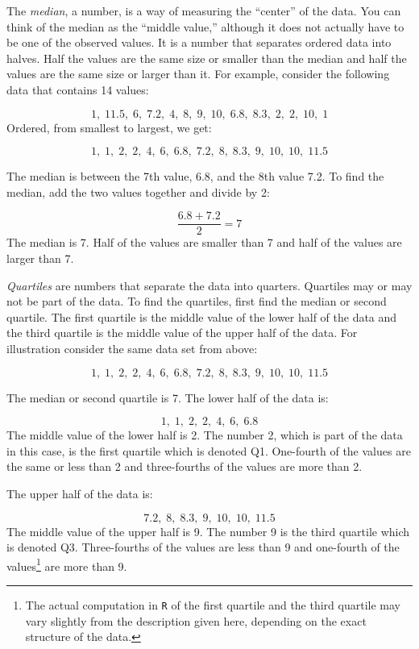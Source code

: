 \documentclass[]{krantz}
\theoremstyle{definition}
\theoremstyle{definition}
\theoremstyle{definition}
\theoremstyle{remark}
\begin{document}
The \emph{median}, a number, is a way of measuring the ``center'' of the data.
You can think of the median as the ``middle value,'' although it does not
actually have to be one of the observed values. It is a number that
separates ordered data into halves. Half the values are the same size or
smaller than the median and half the values are the same size or larger
than it. For example, consider the following data that contains 14
values:

\[1,\;   11.5,\;   6,\;   7.2,\;   4,\;   8,\;   9,\;   10,\;   6.8,\;   8.3,\;   2,\;   2,\;   10,\;   1\]
Ordered, from smallest to largest, we get:

\[1,\;   1,\;   2,\;   2,\;   4,\;   6,\;   6.8,\;   7.2,\;   8,\;   8.3,\;   9,\;   10,\;   10,\;   11.5\]

The median is between the 7th value, 6.8, and the 8th value 7.2. To find
the median, add the two values together and divide by 2:

\[\frac{6.8+7.2}{2} = 7\] The median is 7. Half of the values are
smaller than 7 and half of the values are larger than 7.

\emph{Quartiles} are numbers that separate the data into quarters. Quartiles
may or may not be part of the data. To find the quartiles, first find
the median or second quartile. The first quartile is the middle value of
the lower half of the data and the third quartile is the middle value of
the upper half of the data. For illustration consider the same data set
from above:

\[1,\;   1,\;   2,\;   2,\;   4,\;   6,\;   6.8,\;   7.2,\;   8,\;   8.3,\;   9,\;   10,\;   10,\;   11.5\]

The median or second quartile is 7. The lower half of the data is:

\[1,\;   1,\;   2,\;   2,\;   4,\;   6,\;   6.8\] The middle value of
the lower half is 2. The number 2, which is part of the data in this
case, is the first quartile which is denoted Q1. One-fourth of the
values are the same or less than 2 and three-fourths of the values are
more than 2.

The upper half of the data is:

\[7.2,\;   8,\;   8.3,\;   9,\;   10,\;   10,\;   11.5\] The middle
value of the upper half is 9. The number 9 is the third quartile which
is denoted Q3. Three-fourths of the values are less than 9 and
one-fourth of the values\footnote{The actual computation in \texttt{R} of the first quartile and the third
  quartile may vary slightly from the description given here,
  depending on the exact structure of the data.} are more than 9.
\end{document}

